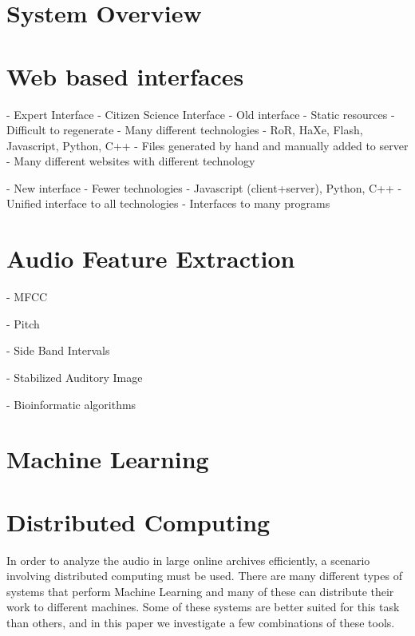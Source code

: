 \label{chapter:software_and_systems}

\section{System Overview}



\section{Web based interfaces}



- Expert Interface
- Citizen Science Interface
- Old interface
	- Static resources
	- Difficult to regenerate
	- Many different technologies
		- RoR, HaXe, Flash, Javascript, Python, C++
	- Files generated by hand and manually added to server
	- Many different websites with different technology


- New interface
	- Fewer technologies
		- Javascript (client+server), Python, C++
	- Unified interface to all technologies
	- Interfaces to many programs




\section{Audio Feature Extraction}


- MFCC


- Pitch


- Side Band Intervals


- Stabilized Auditory Image


- Bioinformatic algorithms



\section{Machine Learning}






\section{Distributed Computing}


In order to analyze the audio in large online archives efficiently, a
scenario involving distributed computing must be used.  There are many
different types of systems that perform Machine Learning and many of
these can distribute their work to different machines.  Some of these
systems are better suited for this task than others, and in this paper
we investigate a few combinations of these tools.

